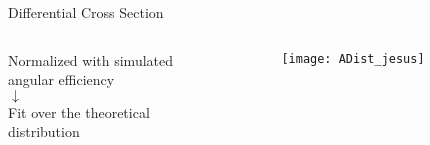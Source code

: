 \begin{frame}{Differential Cross Section}
    	\vspace{-0.05\textheight}
    \begin{overlayarea}{\textwidth}{0.1\textheight}
	\centering
	\end{overlayarea}	
	\vspace{-0.08\textheight}
	\begin{columns}
		\begin{column}{0.4\textwidth}
			\begin{overlayarea}{\textwidth}{\textheight}
				\centering
				\vspace{0.2\textheight}
				Normalized with simulated\\ angular efficiency\\
				$\downarrow$\\
				Fit over the theoretical\\ distribution
			\end{overlayarea}
		\end{column}
		\begin{column}{0.6\textwidth}
			\begin{overlayarea}{\textwidth}{\textheight}
				\centering      
				\texttt{[image: ADist\_jesus]}			 				
		    \end{overlayarea}	
		\end{column}
	\end{columns}
\end{frame}


